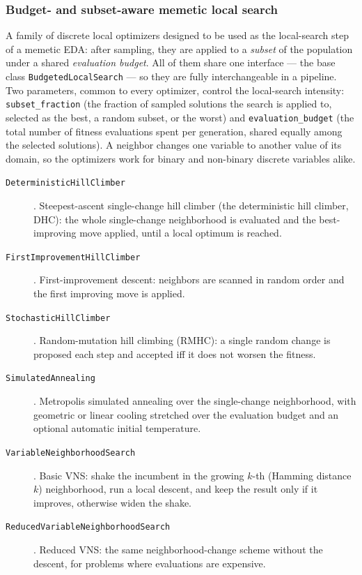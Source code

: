 \documentclass[a4paper,11pt]{article}
\begin{document}
\subsubsection{Budget- and subset-aware memetic local search}
\label{sec:budgeted_ls}

A family of discrete local optimizers designed to be used as the local-search
step of a memetic EDA: after sampling, they are applied to a \emph{subset} of the
population under a shared \emph{evaluation budget}.  All of them share one
interface --- the base class \texttt{BudgetedLocalSearch} --- so they are fully
interchangeable in a pipeline.  Two parameters, common to every optimizer,
control the local-search intensity: \texttt{subset\_fraction} (the fraction of
sampled solutions the search is applied to, selected as the best, a random
subset, or the worst) and \texttt{evaluation\_budget} (the total number of
fitness evaluations spent per generation, shared equally among the selected
solutions).  A neighbor changes one variable to another value of its domain, so
the optimizers work for binary and non-binary discrete variables alike.

\begin{description}
  \item[\texttt{DeterministicHillClimber}] \citep{Radetic_et_al:2009}.
    Steepest-ascent single-change hill climber (the deterministic hill climber,
    DHC): the whole single-change neighborhood is evaluated and the
    best-improving move applied, until a local optimum is reached.

  \item[\texttt{FirstImprovementHillClimber}] \citep{Hansen_and_Mladenovic:2003}.
    First-improvement descent: neighbors are scanned in random order and the
    first improving move is applied.

  \item[\texttt{StochasticHillClimber}].
    Random-mutation hill climbing (RMHC): a single random change is proposed
    each step and accepted iff it does not worsen the fitness.

  \item[\texttt{SimulatedAnnealing}] \citep{Kirkpatrick_et_al:1983}.
    Metropolis simulated annealing over the single-change neighborhood, with
    geometric or linear cooling stretched over the evaluation budget and an
    optional automatic initial temperature.

  \item[\texttt{VariableNeighborhoodSearch}] \citep{Hansen_and_Mladenovic:2003}.
    Basic VNS: shake the incumbent in the growing $k$-th (Hamming distance $k$)
    neighborhood, run a local descent, and keep the result only if it improves,
    otherwise widen the shake.

  \item[\texttt{ReducedVariableNeighborhoodSearch}] \citep{Hansen_and_Mladenovic:2003}.
    Reduced VNS: the same neighborhood-change scheme without the descent, for
    problems where evaluations are expensive.
\end{description}
\end{document}

